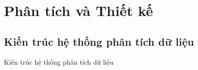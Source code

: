 \documentclass{beamer}
\begin{document}
\section{Phân tích và Thiết kế}
\subsection{Kiến trúc hệ thống phân tích dữ liệu}
\begin{frame}{Kiến trúc hệ thống phân tích dữ liệu}

\begin{columns}


\end{columns}
\end{frame}
\end{document}
